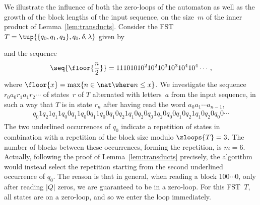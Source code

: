 \begin{example}\label{ex:label}
  We illustrate the influence of both the zero-loops of the automaton 
  as well as the growth of the block lengths of the input sequence,
  on the size~$m$ of the inner product of Lemma~\ref{lem:transducts}.
Consider the FST~$T = \tup{\{q_0,q_1,q_2\},q_0,\delta,\lambda}$ given by 
  \begin{center}
  \end{center}
  and the sequence 
  \begin{align*}
    \seq{\floor{\frac{n}{2}}} = 1 1 10 10 10^2 10^2 10^3 10^3 10^4 10^4 \cdots \,,
  \end{align*}
  where $\floor{x} = \max \{ n \in \nat \where n \le x \}$.
We investigate the sequence $r_0 a_0 r_1 a_1 r_2 \cdots$ of states~$r$ of $T$ alternated 
  with letters~$a$ from the input sequence, in such a way that $T$ is in state $r_n$ 
  after having read the word $a_0 a_1 \cdots a_{n-1}$,
  \begin{align*}
\underline{q_0} 1 q_2 1 q_1 1 q_0 0 q_1 1 q_0 0 
    q_1 1 q_0 0 q_1 0 q_2 1 q_1 0 q_2 0 
    \underline{q_0} 1 q_2 0 q_0 0 q_1 0 q_2 1 q_1 0 q_2 0 q_0 0 \cdots
  \end{align*}
  The two underlined occurrences of $q_0$ indicate a repetition of states 
  in combination with a repetition of the block size modulo $\zloops{T} = 3$.
  The number of blocks between these occurrences, forming the repetition, is $m = 6$.
  Actually, following the proof of Lemma~\ref{lem:transducts} precisely, 
  the algorithm would instead select the repetition 
  starting from the second underlined occurrence of $q_0$. 
  The reason is that in general, when reading a block $100\cdots0$,
  only after reading $|Q|$ zeros, we are guaranteed to be in a zero-loop.
  For this FST~$T$, all states are on a zero-loop, 
  and so we enter the loop immediately.
\end{example}

